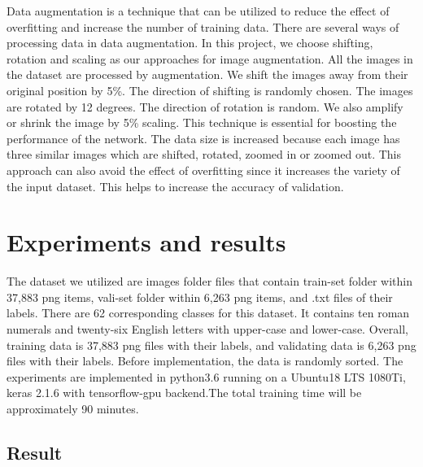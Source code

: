 \documentclass[twoside,twocolumn,10.8pt]{article}
\begin{document}
Data augmentation is a technique that can be utilized to reduce the effect of overfitting and increase the number of training data. There are several ways of processing data in data augmentation. In this project, we choose shifting, rotation and scaling as our approaches for image augmentation. All the images in the dataset are processed by augmentation. We shift the images away from their original position by 5\%. The direction of shifting is randomly chosen. The images are rotated by 12 degrees. The direction of rotation is random. We also amplify or shrink the image by 5\% scaling. This technique is essential for boosting the performance of the network. The data size is increased because each image has three similar images which are shifted, rotated, zoomed in or zoomed out. This approach can also avoid the effect of overfitting since it increases the variety of the input dataset. This helps to increase the accuracy of validation. 

\section{Experiments and results}

The dataset we utilized are images folder files that contain train-set folder within 37,883 png items, vali-set folder within 6,263 png items, and .txt files of their labels. There are 62 corresponding classes for this dataset. It contains ten roman numerals and twenty-six English letters  with upper-case and lower-case. Overall, training data is 37,883 png files with their labels, and validating data is 6,263 png files with their labels. Before implementation, the data is randomly sorted. The experiments are implemented in python3.6 running on a Ubuntu18 LTS 1080Ti, keras 2.1.6 with tensorflow-gpu backend.The total training time will be approximately 90 minutes. 

\subsection{Result}
\end{document}
